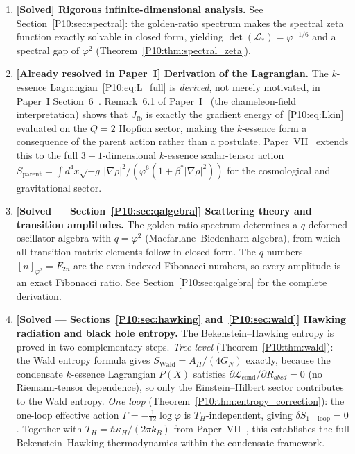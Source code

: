 \documentclass[11pt,a4paper]{article}
\theoremstyle{definition}
\theoremstyle{remark}
\newcommand{\vp}{\varphi}
\newcommand{\bst}{\beta^{*}}
\begin{document}
\begin{enumerate}[label=(\arabic*)]
\item \textbf{[Solved] Rigorous infinite-dimensional analysis.}
  See Section~\ref{P10:sec:spectral}: the golden-ratio spectrum
  makes the spectral zeta function exactly solvable in closed form,
  yielding $\det(\mathcal{L}_*) = \vp^{-1/6}$ and a spectral gap
  of $\vp^2$ (Theorem~\ref{P10:thm:spectral_zeta}).

\item \textbf{[Already resolved in Paper~I] Derivation of the Lagrangian.}
  The $k$-essence Lagrangian~\eqref{P10:eq:L_full} is \emph{derived},
  not merely motivated, in Paper~I Section~6~\cite{Paper1}.
  Remark~6.1 of Paper~I~\cite{Paper1} (the chameleon-field interpretation) shows that $J_\mathrm{fb}$
  is exactly the gradient energy of~\eqref{P10:eq:Lkin} evaluated on
  the $Q=2$ Hopfion sector, making the $k$-essence form
  a consequence of the parent action rather than a postulate.
  Paper~VII~\cite{Paper7} extends this to the full $3+1$-dimensional
  $k$-essence scalar-tensor action
  $S_\mathrm{parent} = \int d^4x\sqrt{-g}\,
  |\nabla\rho|^2/(\vp^6(1+\bst|\nabla\rho|^2))$
  for the cosmological and gravitational sector.

\item \textbf{[Solved --- Section~\ref{P10:sec:qalgebra}] Scattering theory and transition amplitudes.}
  The golden-ratio spectrum determines a $q$-deformed oscillator algebra
  with $q=\vp^2$ (Macfarlane--Biedenharn algebra), from which all
  transition matrix elements follow in closed form.
  The $q$-numbers $[n]_{\vp^2} = F_{2n}$ are the even-indexed Fibonacci
  numbers, so every amplitude is an exact Fibonacci ratio.
  See Section~\ref{P10:sec:qalgebra} for the complete derivation.

\item \textbf{[Solved --- Sections~\ref{P10:sec:hawking} and~\ref{P10:sec:wald}]
  Hawking radiation and black hole entropy.}
  The Bekenstein--Hawking entropy is proved in two complementary steps.
  \emph{Tree level} (Theorem~\ref{P10:thm:wald}): the Wald entropy formula
  gives $S_\mathrm{Wald} = A_H/(4G_N)$ exactly, because the condensate
  $k$-essence Lagrangian $P(X)$ satisfies
  $\partial\mathcal{L}_\mathrm{cond}/\partial R_{abcd} = 0$
  (no Riemann-tensor dependence), so only the Einstein--Hilbert
  sector contributes to the Wald entropy.
  \emph{One loop} (Theorem~\ref{P10:thm:entropy_correction}): the one-loop
  effective action $\Gamma = -\tfrac{1}{12}\log\vp$ is $T_H$-independent,
  giving $\delta S_\mathrm{1-loop} = 0$.
  Together with $T_H = \hbar\kappa_H/(2\pi k_B)$ from
  Paper~VII~\cite{Paper7}, this establishes the full
  Bekenstein--Hawking thermodynamics within the condensate framework.
\end{enumerate}
\end{document}
